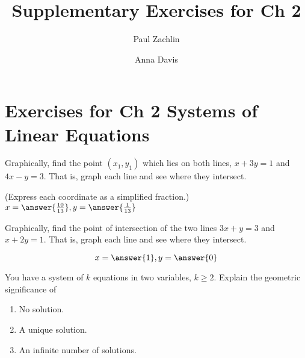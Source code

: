 \documentclass{ximera}
\author{Paul Zachlin \and Anna Davis} \title{Supplementary Exercises for Ch 2} \license{CC-BY 4.0}
\begin{document}
\begin{abstract}
\end{abstract}
\maketitle

\section*{Exercises for Ch 2 Systems of Linear Equations}

\begin{problem}\label{prb:2.1}
Graphically, find the point $\left( x_{1},y_{1}\right) $ which
lies on both lines, $x+3y=1$ and $4x-y=3.$  That is, graph each line
and see where they intersect.

(Express each coordinate as a simplified fraction.) $x=\answer{\frac{10}{13}},y=\answer{\frac{1}{13}}$
\end{problem}


\begin{problem}\label{prb:2.2}
Graphically, find the point of intersection of the two lines $
3x+y=3$ and $x+2y=1.$ That is, graph each line
and see where they intersect.

 $$x=\answer{1},y=\answer{0}$$
\end{problem}

\begin{problem}\label{prb:2.3} You have a system of $k$ equations in two variables, $k\geq 2$.
Explain the geometric significance of

\begin{enumerate}
\item No solution.

\item A unique solution.

\item An infinite number of solutions.
\end{enumerate}

\end{problem}
\end{document}
